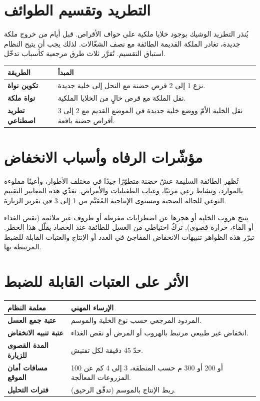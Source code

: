 \section{التطريد وتقسيم الطوائف}
يُنذر التطريد الوشيك بوجود خلايا ملكية على حواف الأقراص. قبل أيام من خروج ملكة
جديدة، تغادر الملكة القديمة الطائفة مع نصف الشغّالات. لذلك يجب أن يتيح النظام
استباق التقسيم. تُقرَّر ثلاث طرق مرجعية كأسباب تدخّل.
\begin{xltabular}{\textwidth}{>{\bfseries}p{4.5cm} X}
\toprule
\textbf{الطريقة} & \textbf{المبدأ} \\
\midrule
\endhead
تكوين نواة & نزع 1 إلى 2 قرص حضنة مع النحل إلى خلية جديدة. \\
نواة ملكة & نقل الملكة مع قرص خالٍ من الخلايا الملكية. \\
تطريد اصطناعي & نقل الخلية الأمّ ووضع خلية جديدة في الموضع القديم مع 2 إلى 3 أقراص حضنة يافعة. \\
\bottomrule
\end{xltabular}

\section{مؤشّرات الرفاه وأسباب الانخفاض}
تُظهر الطائفة السليمة عشّ حضنة متطوّرًا جيدًا في مختلف الأطوار، وأعينًا مملوءة
بالموارد، ونشاط رعي مرئيًا، وغياب الطفيليات والأمراض. تغذّي هذه المعايير التقييم
النوعي للحالة الصحية ومستوى الإنتاجية المُقيَّم من 1 إلى 3 في تقرير الزيارة.

ينتج هروب الخلية أو هجرها عن اضطرابات مفرطة أو ظروف غير ملائمة (نقص الغذاء أو
الماء، حرارة قصوى). تركُ احتياطي من العسل للطائفة عند الحصاد يقلّل هذا الخطر.
تبرّر هذه الظواهر تنبيهات الانخفاض المفاجئ في العدد أو الإنتاج والعتبات القابلة
للضبط المرتبطة بها.

\section{الأثر على العتبات القابلة للضبط}
\begin{xltabular}{\textwidth}{>{\bfseries}p{4.5cm} X}
\toprule
\textbf{معلمة النظام} & \textbf{الإرساء المهني} \\
\midrule
\endhead
عتبة جمع العسل & المردود المرجعي حسب نوع الخلية والموسم. \\
عتبة تنبيه الانخفاض & انخفاض غير طبيعي مرتبط بالهروب أو المرض أو نقص الغذاء. \\
المدة القصوى للزيارة & حدّ 45 دقيقة لكل تفتيش. \\
مسافات أمان الموقع & 100 أو 200 أو 300 م حسب المنطقة، 3 إلى 4 كم عن المزروعات المعالَجة. \\
فترات التحليل & ربط الإنتاج بالموسم (تدفّق الرحيق). \\
\bottomrule
\end{xltabular}
